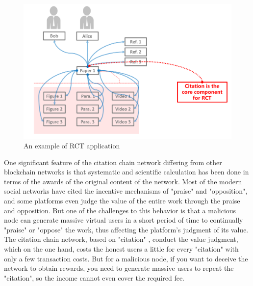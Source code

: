 \documentclass[a4paper,oneside,openany]{tufte-book}
\begin{document}
\begin{figure}
  \includegraphics[width=\textwidth]{fig/bobAlice.png}
  \caption{An example of RCT application}
\end{figure}



One significant feature of the citation chain network differing from other blockchain networks is that systematic and scientific calculation has been done in terms of the awards of the original content of the network. Most of the modern social networks have cited the incentive mechanisms of "praise" and "opposition", and some platforms even judge the value of the entire work through the praise and opposition. But one of the challenges to this behavior is that a malicious node can generate massive virtual users in a short period of time to continually "praise" or "oppose" the work, thus affecting the platform's judgment of its value. The citation chain network, based on "citation" , conduct the value judgment, which on the one hand, costs the honest users a little for every "citation" with only a few transaction costs. But for a malicious node, if you want to deceive the network to obtain rewards, you need to generate massive users to repeat the "citation", so the income cannot even cover the required fee.
\end{document}
